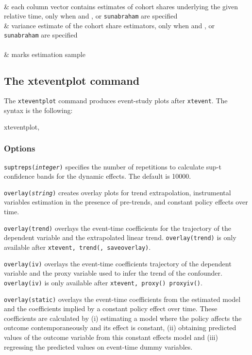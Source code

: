 \documentclass[12pt]{article}
\begin{document}
\begin{stresults2}
	\\
	 & each column vector contains estimates of cohort shares underlying the given relative time, only when  and , or {\tt sunabraham} are specified
	\\
	 & variance estimate of the cohort share estimators, only when  and , or {\tt sunabraham} are specified
	\\
	 \\
	 & marks estimation sample
	\\
\end{stresults2}

\subsection{The xteventplot command}
The \texttt{xteventplot} command produces event-study plots after \texttt{xtevent}. The syntax is the following:
\begin{stsyntax}
	xteventplot,
\end{stsyntax}

\subsubsection{Options}
\hangpara
\sloppypar \noindent
\texttt{suptreps({\it integer})} specifies the number of repetitions to calculate \citet{montiel2019simultaneous} sup-t confidence bands for the dynamic effects. The default is 10000.

\hangpara
\texttt{overlay({\it string})} creates overlay plots for trend extrapolation, instrumental variables estimation in the presence of pre-trends, and constant policy effects over time.

\morehangpara
\texttt{overlay(trend)} overlays the event-time coefficients for the trajectory of the dependent variable and the extrapolated linear trend.
\texttt{overlay(trend)} is only available after \texttt{xtevent, trend(, saveoverlay)}.

\morehangpara
\texttt{overlay(iv)} overlays the event-time coefficients trajectory of the dependent variable and the proxy variable used to infer the trend of the confounder.
\texttt{overlay(iv)} is only available after \texttt{xtevent, proxy() proxyiv()}.

\morehangpara
\texttt{overlay(static)} overlays the event-time coefficients from the estimated model and the coefficients implied by a constant policy effect over time.
These coefficients are calculated by
(i) estimating a model where the policy affects the outcome contemporaneously and its effect is constant,
(ii) obtaining predicted values of the outcome variable from this constant effects model and
(iii) regressing the predicted values on event-time dummy variables.
\end{document}

